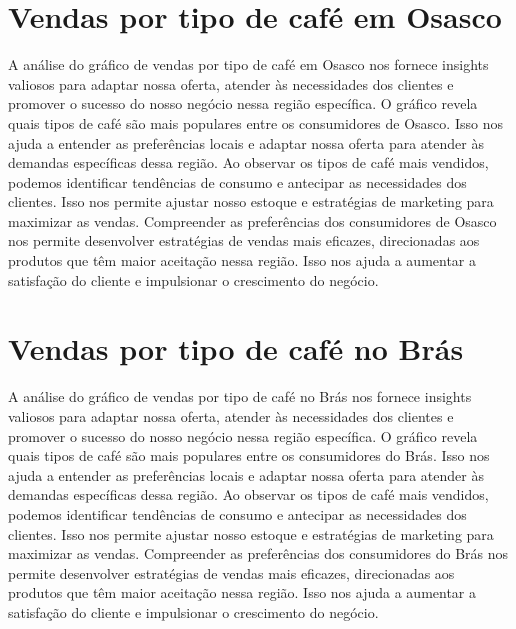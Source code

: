\section{Vendas por tipo de café em Osasco}
A análise do gráfico de vendas por tipo de café em Osasco nos fornece insights valiosos para adaptar nossa oferta, atender às necessidades dos clientes e promover o sucesso do nosso negócio nessa região específica.
O gráfico revela quais tipos de café são mais populares entre os consumidores de Osasco. Isso nos ajuda a entender as preferências locais e adaptar nossa oferta para atender às demandas específicas dessa região.
Ao observar os tipos de café mais vendidos, podemos identificar tendências de consumo e antecipar as necessidades dos clientes. Isso nos permite ajustar nosso estoque e estratégias de marketing para maximizar as vendas.
Compreender as preferências dos consumidores de Osasco nos permite desenvolver estratégias de vendas mais eficazes, direcionadas aos produtos que têm maior aceitação nessa região. Isso nos ajuda a aumentar a satisfação do cliente e impulsionar o crescimento do negócio.

\section{Vendas por tipo de café no Brás}
A análise do gráfico de vendas por tipo de café no Brás nos fornece insights valiosos para adaptar nossa oferta, atender às necessidades dos clientes e promover o sucesso do nosso negócio nessa região específica.
O gráfico revela quais tipos de café são mais populares entre os consumidores do Brás. Isso nos ajuda a entender as preferências locais e adaptar nossa oferta para atender às demandas específicas dessa região.
Ao observar os tipos de café mais vendidos, podemos identificar tendências de consumo e antecipar as necessidades dos clientes. Isso nos permite ajustar nosso estoque e estratégias de marketing para maximizar as vendas.
Compreender as preferências dos consumidores do Brás nos permite desenvolver estratégias de vendas mais eficazes, direcionadas aos produtos que têm maior aceitação nessa região. Isso nos ajuda a aumentar a satisfação do cliente e impulsionar o crescimento do negócio.

